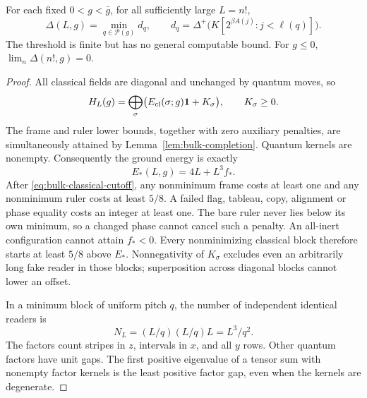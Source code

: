 \begin{lemma}\label{lem:bulk-gap}
For each fixed $0<g<\bar g$, for all sufficiently large $L=n!$,
\begin{equation}\label{eq:bulk-gap-identity}
 \Delta(L,g)=\min_{q\in\mathcal P(g)}d_q,\qquad
 d_q=\Delta^+\bigl(K[2^{\beta A(j)}:j<\ell(q)]\bigr).
\end{equation}
The threshold is finite but has no general computable bound.
For $g\leq0$, $\lim_n\Delta(n!,g)=0$.
\end{lemma}
\begin{proof}
All classical fields are diagonal and unchanged by quantum moves, so
\begin{equation}\label{eq:bulk-blocks}
 H_L(g)=\bigoplus_\sigma
       \bigl(E_{\rm cl}(\sigma;g)\mathbf 1+K_\sigma\bigr),
 \qquad K_\sigma\geq0.
\end{equation}
The frame and ruler lower bounds, together with zero auxiliary
penalties, are simultaneously attained by
Lemma~\ref{lem:bulk-completion}. Quantum kernels are nonempty.
Consequently the ground energy is exactly
\[
 E_*(L,g)=4L+L^3f_*.
\]
After \eqref{eq:bulk-classical-cutoff}, any nonminimum frame costs
at least one and any nonminimum ruler costs at least $5/8$.
A failed flag, tableau, copy, alignment or phase equality costs an
integer at least one. The bare ruler never lies below its own
minimum, so a changed phase cannot cancel such a penalty. An all-inert
configuration cannot attain $f_*<0$. Every nonminimizing classical
block therefore starts at least $5/8$ above $E_*$. Nonnegativity of
$K_\sigma$ excludes even an arbitrarily long fake reader in those
blocks; superposition across diagonal blocks cannot lower an offset.

In a minimum block of uniform pitch $q$, the number of independent
identical readers is
\begin{equation}\label{eq:bulk-reader-count}
 N_L=(L/q)(L/q)L=L^3/q^2.
\end{equation}
The factors count stripes in $z$, intervals in $x$, and all $y$ rows.
Other quantum factors have unit gaps. The first positive eigenvalue
of a tensor sum with nonempty factor kernels is the least positive
factor gap, even when the kernels are degenerate.


\end{proof}
